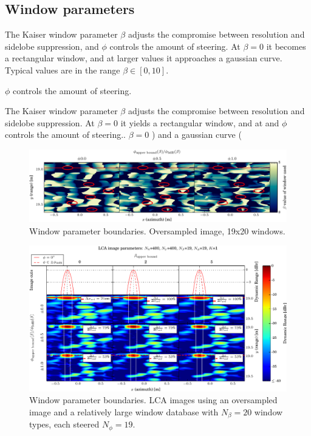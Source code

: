 \documentclass[10pt,journal,draftclsnofoot,onecolumn]{IEEEtran}
\let\MYoriglatexcaption\caption               %
\renewcommand{\caption}[2][\relax]{\MYoriglatexcaption[#2]{#2}}
\newcommand\1{\vec 1}
\begin{document}
\subsection{Window parameters}

The Kaiser window parameter $\beta$ adjusts the compromise between resolution and sidelobe suppression, and $\phi$ controls the amount of steering. At $\beta=0$ it becomes a rectangular window, and at larger values it approaches a gaussian curve. Typical values are in the range $\beta\in[0,10]$.

$\phi$ controls the amount of steering. 

The Kaiser window parameter $\beta$ adjusts the compromise between resolution and sidelobe suppression. At $\beta=0$ it yields a rectangular window, and at and $\phi$ controls the amount of steering.. $\beta=0$ ) and a gaussian curve (


\begin{figure}[tbhp!]%
\includegraphics[width=.2\textwidth]{gfx/oversampling_mosaic_bounds_lca_windows_beta.pdf}%
\caption{Window parameter boundaries. Oversampled image, 19x20 windows.}\label{oversampling_mosaic_bounds}
\end{figure}

\newpage
\begin{figure}[tbhp!]%
\includegraphics[width=\textwidth]{gfx/oversampling_mosaic_bounds.pdf}%
\caption{Window parameter boundaries. LCA images using an oversampled image and a relatively large window database with $N_\beta=20$ window types, each steered $N_\phi=19$. }\label{oversampling_mosaic_bounds_beta}
\end{figure}
\end{document}
